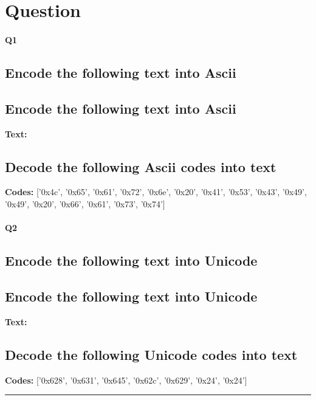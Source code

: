 
\section{Question}


\paragraph{Q1}




\subsection*{Encode the following text into Ascii}
\subsection*{Encode the following text into Ascii}
    \textbf{Text:} 

\subsection*{Decode the following Ascii codes into text}
\textbf{Codes:} ['0x4c', '0x65', '0x61', '0x72', '0x6e', '0x20', '0x41', '0x53', '0x43', '0x49', '0x49', '0x20', '0x66', '0x61', '0x73', '0x74']


\paragraph{Q2}




\subsection*{Encode the following text into Unicode}
\subsection*{Encode the following text into Unicode}
    \textbf{Text:} 

\subsection*{Decode the following Unicode codes into text}
\textbf{Codes:} ['0x628', '0x631', '0x645', '0x62c', '0x629', '0x24', '0x24']



\hrule width 1\linewidth
\pagebreak

